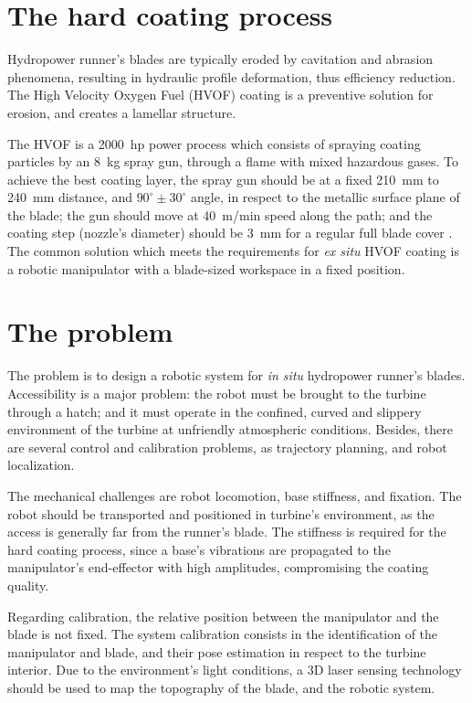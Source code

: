 \section{The hard coating process}\label{hvof}

Hydropower runner's blades are typically eroded by cavitation and abrasion
phenomena, resulting in hydraulic profile deformation, thus efficiency
reduction. The High Velocity Oxygen Fuel (HVOF) coating is a preventive
solution for erosion, and creates a lamellar structure. 

The HVOF is a 2000~hp power process which consists of
spraying coating particles by an 8~kg spray gun, through a flame with mixed
hazardous gases. To achieve the best coating layer, the spray gun should be at
a fixed 210~mm to 240~mm distance, and $90^\circ \pm 30^\circ$ angle, in respect
to the metallic surface plane of the blade; the gun should move at 40~m/min
speed along the path; and the coating step (nozzle's diameter) should be 3~mm
for a regular full blade cover \cite{li2002effect}. The
common solution which meets the requirements for \textit{ex situ} HVOF coating
is a robotic manipulator with a blade-sized workspace in a fixed position.

\section{The problem}\label{problem}

The problem is to design a robotic system for \textit{in situ}
hydropower runner's blades. Accessibility is a major problem: the robot must be
brought to the turbine through a hatch; and it must operate in the confined,
curved and slippery environment of the turbine at unfriendly atmospheric
conditions. Besides, there are several control and calibration problems, as
trajectory planning, and robot localization.

The mechanical challenges are robot locomotion, base stiffness, and
fixation. The robot should be transported and positioned in turbine's
environment, as the access is generally far from the runner's blade.
The stiffness is required for the hard coating process, since a base's
vibrations are propagated to the manipulator's end-effector with high
amplitudes, compromising the coating quality. 

Regarding calibration, the relative position between the manipulator and the
blade is not fixed. The system calibration consists in the identification of
the manipulator and blade, and their pose estimation in respect to the turbine
interior. Due to the environment's light conditions, a 3D laser sensing
technology should be used to map the topography of the blade, and the robotic
system. 

